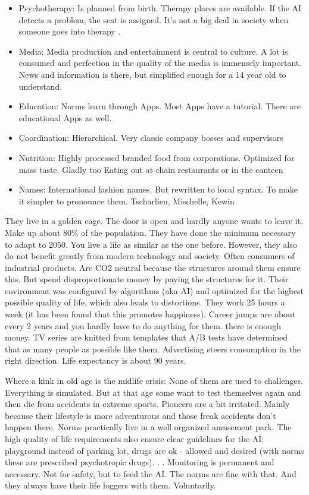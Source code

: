 \begin{itemize}
    \item Psychotherapy: Is planned from birth. Therapy places are available. If the AI detects a problem, the seat is assigned. It's not a big deal in society when someone goes into therapy .
    \item Media: Media production and entertainment is central to culture. A lot is consumed and perfection in the quality of the media is immensely important. News and information is there, but simplified enough for a 14 year old to understand.
    \item Education: Norms learn through Apps. Most Apps have a tutorial. There are educational Apps as well.
    \item Coordination: Hierarchical. Very classic company bosses and supervisors
    \item Nutrition: Highly processed branded food from corporations. Optimized for mass taste. Gladly too Eating out at chain restaurants or in the canteen
    \item Names: International fashion names. But rewritten to local syntax. To make it simpler to pronounce them. Tscharlien, Mischelle, Kewin
\end{itemize}

They live in a golden cage. The door is open and hardly anyone wants to leave it.
Make up about 80\% of the population. They have done the minimum necessary to adapt to 2050. You live  a life as similar as the one before. However, they also do not benefit greatly from modern technology and society. Often consumers of industrial products. Are CO2 neutral because the structures around them ensure this. But spend disproportionate money by paying the structures for it. Their environment was configured by algorithms (aka AI) and optimized for the highest possible quality of life, which also leads to distortions. They work 25 hours a week (it has been found that this promotes happiness). Career jumps are about every 2 years and you hardly have to do anything for them. there is enough money. TV series are knitted from templates that A/B tests have determined that as many people as possible like them. Advertising steers consumption in the right direction. Life expectancy is about 90 years.

Where a kink in old age is the midlife crisis:
None of them are used to challenges. Everything is simulated. But at that age some want to test themselves again and then die from accidents in extreme sports. Pioneers are a bit irritated. Mainly because their lifestyle is more adventurous and those freak accidents don't happen there.
Norms practically live in a well organized amusement park. The high quality of life requirements also ensure clear guidelines for the AI: playground instead of parking lot, drugs are ok - allowed and desired (with norms these are prescribed psychotropic drugs). . . Monitoring is permanent and
necessary. Not for safety, but to feed the AI. The norms are fine with that. And they always have their life loggers with them. Voluntarily.


